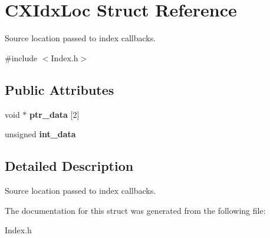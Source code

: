 \hypertarget{structCXIdxLoc}{}\section{C\+X\+Idx\+Loc Struct Reference}
\label{structCXIdxLoc}


Source location passed to index callbacks.  




{\ttfamily \#include $<$Index.\+h$>$}

\subsection*{Public Attributes}
\begin{DoxyCompactItemize}
\item 
\mbox{\label{structCXIdxLoc_aab92ffd1d5add2570c5abea1214a68b1}} 
void $\ast$ {\bfseries ptr\+\_\+data} \mbox{[}2\mbox{]}
\item 
\mbox{\label{structCXIdxLoc_a4e5e51f7e557cde7a48bffeaf47cd94e}} 
unsigned {\bfseries int\+\_\+data}
\end{DoxyCompactItemize}


\subsection{Detailed Description}
Source location passed to index callbacks. 

The documentation for this struct was generated from the following file\+:\begin{DoxyCompactItemize}
\item 
Index.\+h\end{DoxyCompactItemize}
